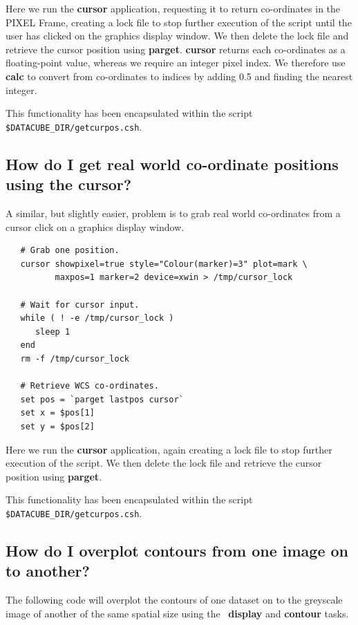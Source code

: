 \documentclass[twoside,11pt]{article}
\newcommand{\xref}[3]{#1}
\begin{document}
{Here we run the \xref{{\bf cursor}}{sun95}{CURSOR} application, requesting
it to return co-ordinates in the \xref{PIXEL Frame}{sun95}{se_wcsuse},
creating a lock file to stop further execution of the script until the
user has clicked on the graphics display window.  We then delete the
lock file and retrieve the cursor position using
\xref{{\bf parget}}{sun95}{PARGET}.  {\bf cursor} returns each co-ordinates as
a floating-point value, whereas we require an integer pixel index.  We
therefore use \xref{{\bf calc}}{sun95}{CALC} to convert from co-ordinates to
indices by adding 0.5 and finding the nearest integer.

This functionality has been encapsulated within the script
{\tt \$DATACUBE\_DIR/getcurpos.csh}.

\subsection{How do I get real world co-ordinate positions using the cursor?}

A similar, but slightly easier, problem is to grab real world
co-ordinates from a cursor click on a graphics display window.

\small\begin{verbatim}
   # Grab one position.
   cursor showpixel=true style="Colour(marker)=3" plot=mark \
          maxpos=1 marker=2 device=xwin > /tmp/cursor_lock

   # Wait for cursor input.	  
   while ( ! -e /tmp/cursor_lock )
      sleep 1
   end
   rm -f /tmp/cursor_lock
   
   # Retrieve WCS co-ordinates.
   set pos = `parget lastpos cursor`
   set x = $pos[1]
   set y = $pos[2]
\end{verbatim}\normalsize

Here we run the \xref{{\bf cursor}}{sun95}{CURSOR} application, again
creating a lock file to stop further execution of the script.  We then
delete the lock file and retrieve the cursor position using
\xref{{\bf parget}}{sun95}{PARGET}.

This functionality has been encapsulated within the script
{\tt \$DATACUBE\_DIR/getcurpos.csh}.


\subsection{How do I overplot contours from one image on to another?}

The following code will overplot the contours of one dataset on to the
greyscale image of another of the same spatial size using the \KAPPA\ 
\xref{{\bf display}}{sun95}{DISPLAY} and \xref{{\bf contour}}{sun95}{CONTOUR}
tasks.

}
\end{document}
